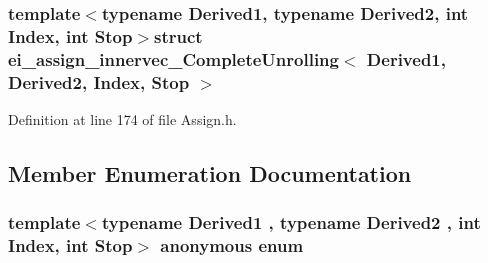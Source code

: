 \subsubsection*{template$<$typename Derived1, typename Derived2, int Index, int Stop$>$struct ei\-\_\-assign\-\_\-innervec\-\_\-\-Complete\-Unrolling$<$ Derived1, Derived2, Index, Stop $>$}



Definition at line 174 of file Assign.\-h.



\subsection{Member Enumeration Documentation}
\hypertarget{structei__assign__innervec___complete_unrolling_a6e00c2b5e63354e8c5c58a3bdcf5d35a}{\subsubsection[{anonymous enum}]{\setlength{\rightskip}{0pt plus 5cm}template$<$typename Derived1 , typename Derived2 , int Index, int Stop$>$ anonymous enum}}\label{structei__assign__innervec___complete_unrolling_a6e00c2b5e63354e8c5c58a3bdcf5d35a}
